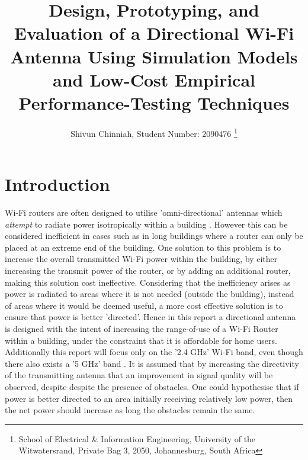 \documentclass[10pt,twocolumn,hidelinks]{witseiepaper}
\begin{document}
\title{Design, Prototyping, and Evaluation of a Directional Wi-Fi Antenna
    Using Simulation Models and Low-Cost Empirical Performance-Testing
    Techniques}

\author{Shivun Chinniah, Student Number: 2090476 \thanks{School of
        Electrical \& Information Engineering, University of the
        Witwatersrand, Private Bag 3, 2050, Johannesburg, South Africa} }



\maketitle




\section{Introduction}

Wi-Fi routers are often designed to utilise 'omni-directional' antennas
which \textit{attempt} to radiate power isotropically  within a building
\cite{wifiantenna}. However this can be considered inefficient in cases
such as in long buildings where a router can only be placed at an extreme
end of the building. One solution to this problem is to increase the
overall transmitted Wi-Fi power within the building, by either increasing
the transmit power of the router, or by adding an additional router, making
this solution cost ineffective. Considering that the inefficiency arises as
power is radiated to areas where it is not needed (outside the building),
instead of areas where it would be deemed useful, a more cost effective
solution is to ensure that power is better 'directed'. Hence in this report
a directional antenna is designed with the intent of increasing the
range-of-use of a Wi-Fi Router within a building, under the constraint that
it is affordable for home users. Additionally this report will focus only
on the '2.4 GHz' Wi-Fi band, even though there also exists a '5 GHz' band
\cite{802.11}. It is assumed that by increasing the directivity of the
transmitting antenna that an improvement in signal quality will be
observed, despite despite the presence of obstacles. One could hypothesise
that if power is better directed to an area initially receiving relatively
low power, then the net power should increase as long the obstacles remain
the same.
\end{document}
